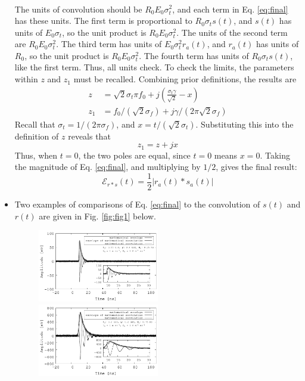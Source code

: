 \documentclass[amsmath,amssymb,aps,prd,10pt,twocolumn,showkeys]{revtex4}
\begin{document}
\begin{itemize}
\begin{multline}
\end{multline}
The units of convolution should be $R_0 E_0\sigma_t^2$, and each term in Eq. \ref{eq:final} has these units.  The first term is proportional to $R_0 \sigma_t s(t)$, and $s(t)$ has units of $E_0 \sigma_t$, so the unit product is $R_0 E_0\sigma_t^2$.  The units of the second term are $R_0 E_0\sigma_t^2$.  The third term has units of $E_0\sigma_t^2 r_a(t)$, and $r_a(t)$ has units of $R_0$, so the unit product is $R_0 E_0\sigma_t^2$.  The fourth term has units of $R_0 \sigma_t s(t)$, like the first term.  Thus, all units check.  To check the limits, the parameters within $z$ and $z_1$ must be recalled.  Combining prior definitions, the results are
\begin{align}
z &= \sqrt{2}\sigma_t \pi f_0 + j\left(\frac{\sigma_t\gamma}{\sqrt{2}} - x\right) \\
z_1 &= f_0/(\sqrt{2}\sigma_f) + j\gamma/(2\pi \sqrt{2} \sigma_f)
\end{align}
Recall that $\sigma_t = 1/(2\pi \sigma_f)$, and $x=t/(\sqrt{2}\sigma_t)$.  Substituting this into the definition of $z$ reveals that
\begin{equation}
z_1 = z + jx
\end{equation}
Thus, when $t=0$, the two poles are equal, since $t=0$ means $x=0$.  Taking the magnitude of Eq. \ref{eq:final}, and multiplying by $1/2$, gives the final result:
\begin{equation}
\mathcal{E}_{r * s}(t) = \frac{1}{2} | r_a(t) * s_a(t) |
\end{equation}
\item Two examples of comparisons of Eq. \ref{eq:final} to the convolution of $s(t)$ and $r(t)$ are given in Fig. \ref{fig:fig1} below.
\begin{figure}[hb]
\centering
\includegraphics[width=0.5\textwidth]{March12_plot1.pdf}
\includegraphics[width=0.5\textwidth]{March12_plot2.pdf}

\end{figure}
\end{itemize}
\end{document}
